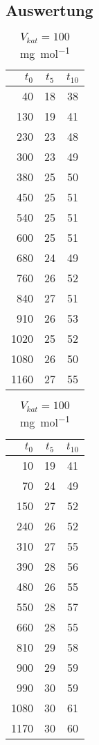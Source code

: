 \documentclass{article}
\begin{document}
\begin{onehalfspace}
\section{Auswertung}

\begin{table}[!htbp]
\parbox{.45\linewidth}{
\centering

\begin{tabular}{rcc}
\hline
 $t_0$ & $t_5$  & $t_{10}$ \\
\hline
40 & 18 & 38 \\
130 & 19 & 41 \\
230 & 23 & 48 \\
300 & 23 & 49 \\
380 & 25 & 50 \\
450 & 25 & 51 \\
540 & 25 & 51 \\
600 & 25 & 51 \\
680 & 24 & 49 \\
760 & 26 & 52 \\
840 & 27 & 51 \\
910 & 26 & 53 \\
1020 & 25 & 52 \\
1080 & 26 & 50 \\
1160 & 27 & 55 \\
\hline
\end{tabular}
\caption{$V_{kat} = 200$ \si{\milli\gram\per\mol}}
}
\hfill
\parbox{.45\linewidth}{
\centering
\begin{tabular}{rcc}
\hline
 $t_0$ & $t_5$  & $t_{10}$ \\
\hline
10 & 19 & 41 \\
70 & 24 & 49 \\
150 & 27 & 52 \\
240 & 26 & 52 \\
310 & 27 & 55 \\
390 & 28 & 56 \\
480 & 26 & 55 \\
550 & 28 & 57 \\
660 & 28 & 55 \\
810 & 29 & 58 \\
900 & 29 & 59 \\
990 & 30 & 59 \\
1080 & 30 & 61  \\
1170 & 30 & 60 \\
\hline
\end{tabular}
\caption{$V_{kat} = 100$ \si{\milli\gram\per\mol}}
}
\end{table}



\end{onehalfspace}
\end{document}
